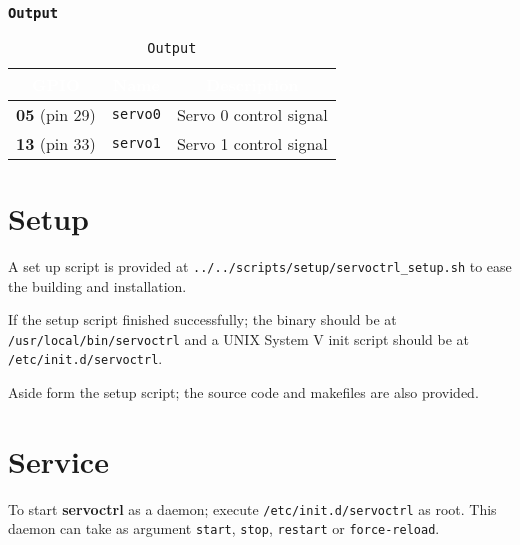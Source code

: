    \subsubsection{\texttt{Output}}
   \begin{table}[!htb]
      \begin{center}
         \begin{tabular}{|c|c|c|}
            \rowcolor{black}
            \textcolor{white}{\textbf{GPIO}}  &
            \textcolor{white}{\textbf{Name}} &
            \textcolor{white}{\textbf{Description}}\\
            \hline
            \hline
            \textbf{05} (pin 29) & \texttt{servo0} & Servo 0 control signal \\
            \hline
            \textbf{13} (pin 33) & \texttt{servo1} & Servo 1 control signal \\
            \hline
         \end{tabular}
         \caption{\texttt{Output}}
         \label{table:output}
      \end{center}
   \end{table}


\section{Setup}
A set up script is provided at \texttt{../../scripts/setup/servoctrl\_setup.sh}
to ease the building and installation.

If the setup script finished successfully; the binary should be at\\
\texttt{/usr/local/bin/servoctrl} and a UNIX System V init script should be at\\
\texttt{/etc/init.d/servoctrl}.

Aside form the setup script; the source code and makefiles are also provided.

\section{Service}
To start \textbf{servoctrl} as a daemon; execute \texttt{/etc/init.d/servoctrl}
as root. This daemon can take as argument \texttt{start}, \texttt{stop},
\texttt{restart} or \texttt{force-reload}.

